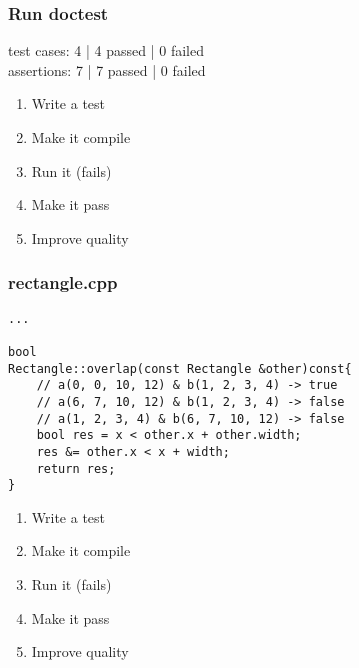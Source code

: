 \begin{frame}[fragile]
\frametitle{Run doctest}
\begin{minipage}[t]{0.48\linewidth}
test cases: 4 | 4 passed | 0 failed\\
assertions: 7 | 7 passed | 0 failed\\
\end{minipage}\hfill
\begin{minipage}[t]{0.28\linewidth}
  \small
  \begin{enumerate} 
    \item \textcolor{deadcolor}{Write a test}
    \item \textcolor{deadcolor}{Make it compile}
    \item \textcolor{deadcolor}{Run it (fails)}
    \item \textcolor{activecolor}{Make it pass}
    \item \textcolor{deadcolor}{Improve quality}
  \end{enumerate} 
\end{minipage}
\end{frame}


\begin{frame}[fragile]
\frametitle{rectangle.cpp}
\begin{minipage}[t]{0.48\linewidth}
\begin{lstlisting}
...

bool 
Rectangle::overlap(const Rectangle &other)const{
    // a(0, 0, 10, 12) & b(1, 2, 3, 4) -> true
    // a(6, 7, 10, 12) & b(1, 2, 3, 4) -> false
    // a(1, 2, 3, 4) & b(6, 7, 10, 12) -> false
    bool res = x < other.x + other.width;
    res &= other.x < x + width;
    return res;
}
\end{lstlisting}
\end{minipage}\hfill
\begin{minipage}[t]{0.28\linewidth}
  \small
  \begin{enumerate} 
    \item \textcolor{deadcolor}{Write a test}
    \item \textcolor{deadcolor}{Make it compile}
    \item \textcolor{deadcolor}{Run it (fails)}
    \item \textcolor{deadcolor}{Make it pass}
    \item \textcolor{activecolor}{Improve quality}
  \end{enumerate} 
\end{minipage}
\end{frame}

